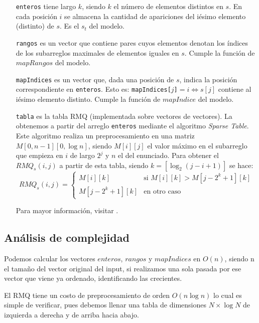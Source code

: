 \begin{itemize}
  \item[\tt enteros] tiene largo $k$, siendo $k$ el número de elementos
  distintos en $s$. En cada posición $i$ se almacena la cantidad de apariciones
  del iésimo elemento (distinto) de $s$. Es el $s_t$ del modelo.

  \item[\tt rangos] es un vector que contiene pares cuyos elementos denotan
  los índices de los subarreglos maximales de elementos iguales en $s$. Cumple
  la función de $mapRangos$ del modelo.

  \item[\tt mapIndices] es un vector que, dada una posición de $s$, indica la posición
  correspondiente en {\tt enteros}. Esto es: {\tt mapIndices[$j$]}$=i \Leftrightarrow s[j]$
  contiene al iésimo elemento distinto. Cumple la función de $mapIndice$ del modelo.

  \item[\tt tabla] es la tabla RMQ (implementada sobre vectores de vectores).
  La obtenemos a partir del arreglo {\tt enteros} mediante el algoritmo {\sl
  Sparse Table}. Este algoritmo realiza un preprocesamiento en una matriz
  $M[0,n-1][0,\log n]$, siendo $M[i][j]$ el valor máximo en el subarreglo
  que empieza en $i$ de largo $2^j$ y $n$ el del enunciado. Para obtener el $RMQ_s(i, j)$ a partir
  de esta tabla, siendo $k = [\log_2(j - i + 1)]$ se hace:
  \[ RMQ_s(i, j) = \left\{ \begin{array}{ll}
                 M[i][k] & \mbox{si $M[i][k] > M[j-2^k+1][k]$}\\
                 M[j-2^k+1][k] & \mbox{en otro caso}\end{array} \right. \]

  Para mayor información, visitar \cite{topcoder}.
\end{itemize}

\subsection*{Análisis de complejidad}

Podemos calcular los vectores $enteros$, $rangos$ y $mapIndices$ en $O(n)$, siendo n el tamaño del
vector original del input, si realizamos una sola pasada por ese vector que viene ya ordenado,
identificando las crecientes.

El RMQ tiene un costo de preprocesamiento de orden $O(n\log n)$ lo cual es
simple de verificar, pues debemos llenar una tabla de dimensiones $N \times
\log N$ de izquierda a derecha y de arriba hacia abajo.

